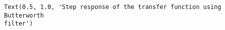 \documentclass[11pt]{article}
\makeatletter
\newcommand{\boxspacing}{\kern\kvtcb@left@rule\kern\kvtcb@boxsep}
\newcommand{\prompt}[4]{
        {\ttfamily\llap{{\color{#2}[#3]:\hspace{3pt}#4}}\vspace{-\baselineskip}}
    }
\makeatother
\begin{document}
            \begin{tcolorbox}[breakable, size=fbox, boxrule=.5pt, pad at break*=1mm, opacityfill=0]
\prompt{Out}{outcolor}{20}{\boxspacing}
\begin{Verbatim}[commandchars=\\\{\}]
Text(0.5, 1.0, 'Step response of the transfer function using Butterworth
filter')
\end{Verbatim}
\end{tcolorbox}
        
    \begin{center}
    \end{center}
    { \hspace*{\fill} \\}
    
\end{document}
